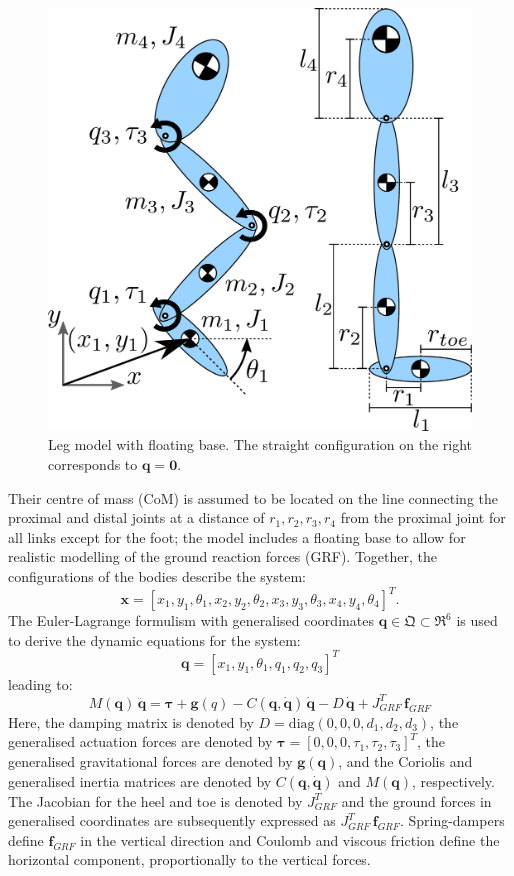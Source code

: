 \documentclass[letterpaper, 10 pt, conference]{ieeeconf}  %
\begin{document}
\begin{figure}[ht]
	\centering
	\includegraphics[width=0.7\linewidth]{Leg_3DoF_model}
	\caption{Leg model with floating base. The straight configuration on
		the right corresponds to $\mathbf{q} = \mathbf{0}$.}
	\label{fig:Leg_3DoF_model}
\end{figure}

Their centre of mass (CoM) is assumed to be located on the line connecting the proximal and distal joints at a distance of $r_1,r_2,r_3,r_4$ from the proximal joint for all links except for the foot; the model includes a floating base to allow for realistic modelling of the ground reaction forces (GRF). Together, the configurations of the bodies describe the system:
\begin{equation}
\mathbf{x} = [x_1,y_1,\theta_1,x_2,y_2,\theta_2, x_3,y_3,\theta_3,x_4,y_4,\theta_4]^T. 
\end{equation}
The Euler-Lagrange formulism with generalised coordinates $\mathbf{q} \in \mathfrak{Q} \subset \mathfrak{R}^{6}$ is used to derive the dynamic equations for the system:
\begin{equation}
\mathbf{q} = [x_1,y_1,\theta_1,q_1,q_2,q_3]^T
\label{eq:q}
\end{equation}
leading to:
\begin{equation}
M(\mathbf{q}) \, \mathbf{\ddot q} = \mathbf{\boldsymbol{\tau}} + \mathbf{g}(q) - C(\mathbf{q, \dot q}) \, \mathbf{\dot q} - D \, \mathbf{\dot q} + J_{GRF}^T \, \mathbf{f}_{GRF}
\label{eq:fwddyn}
\end{equation}
Here, the damping matrix is denoted by $D = \mathrm{diag} (0,0,0,d_1,d_2,d_3)$, the generalised actuation forces are denoted by $\boldsymbol{\tau} = [0,0,0,\tau_1,\tau_2,\tau_3]^T$, the generalised gravitational forces are denoted by $\mathbf{g(q)}$, and the Coriolis and generalised inertia matrices are denoted by $C\mathbf{(q, \dot q)}$ and $M(\mathbf{q})$, respectively. The Jacobian for the heel and toe is denoted by $J_{GRF}^T$ and the ground forces in generalised coordinates are subsequently expressed as $J_{GRF}^T \, \mathbf{f}_{GRF}$. Spring-dampers define $\mathbf{f}_{GRF}$ in the vertical direction and Coulomb and viscous friction define the horizontal component, proportionally to the vertical forces.
\end{document}
